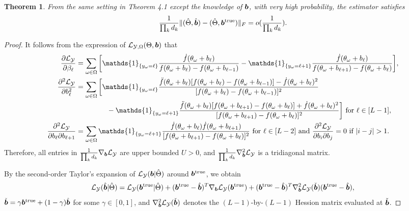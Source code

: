 \documentclass[11pt]{article}
\theoremstyle{plain}
\newtheorem{thm}{Theorem}[section]
\theoremstyle{definition}
\begin{document}
\begin{thm}
  From the same setting in Theorem 4.1 except the knowledge of $\bm{b}$, with very high probability, the estimator satisfies
  \begin{equation}
    \frac{1}{\prod_k d_k}\lVert(\hat\Theta,\hat{\bm{b}})-(\hat\Theta,\bm{b}^{\text{true}})\rVert_F = o(\frac{1}{\prod_k d_k}).
  \end{equation}
\end{thm}

\begin{proof}
It follows from the expression of $\mathcal{L}_{\mathcal{Y},\Omega}(\Theta,\bm{b})$ that
\begin{align}\label{eq:property}
{\partial \flogl\over \partial \beta_\ell}&=\sum_{\omega\in\Omega}\bigg[\mathds{1}_{\{y_{\omega}=\ell\}}
\frac{\dot{f}(\theta_\omega+b_\ell)}{f(\theta_\omega+b_\ell)-f(
\theta_\omega+b_{\ell-1})}-\mathds{1}_{\{y_{\omega}=\ell+1\}}
\frac{\dot{f}(\theta_\omega+b_\ell)}{f(\theta_\omega+b_{\ell+1})-f(\theta_\omega+b_{\ell})}\bigg],\notag\\
{\partial^2 \flogl\over \partial b_\ell^2}&=\sum_{\omega\in\Omega}\bigg[\mathds{1}_{\{y_\omega=\ell\}}\frac{\ddot{f}(\theta_\omega+b_\ell)[f(\theta_\omega+b_\ell)-f(\theta_\omega+b_{\ell-1})]-\dot{f}(\theta_\omega+b_\ell)^2}{[f(\theta_\omega+b_\ell)-f(\theta_\omega+b_{\ell-1})]^2}\\
&\hspace{.6in}-\mathds{1}_{\{y_\omega=\ell+1\}}\frac{\ddot{f}(\theta_\omega+b_\ell)[f(\theta_\omega+b_{\ell+1})-f(\theta_\omega+b_{\ell})]+\dot{f}(\theta_\omega+b_\ell)^2}{[f(\theta_\omega+b_{\ell+1})-f(\theta_\omega+b_{\ell})]^2}\bigg] \text{ for } \ell \in [L-1],\\
{\partial^2 \flogl\over \partial b_\ell \partial b_{\ell+1}}&=\sum_{\omega\in\Omega}\mathds{1}_{\{y_\omega=\ell+1\}}\frac{\dot{f}(\theta_\omega+b_\ell)\dot{f}(\theta_\omega+b_{\ell+1})}{[f(\theta_\omega+b_{\ell+1})-f(\theta_\omega+b_\ell)]^2} \text{ for } \ell \in [L-2] \text{ and } {\partial^2 \flogl\over \partial b_i \partial b_j} = 0 \text{ if } |i-j|>1.
\end{align}
Therefore, all entries in $\frac{1}{\prod_k d_k}\nabla_{\bm{b}}\mathcal{L}_{\mathcal{Y}}$ are upper bounded $U>0$, and  $\frac{1}{\prod_k d_k}\nabla^2_{\bm{b}}\mathcal{L}_{\mathcal{Y}}$ is a tridiagonal matrix.




By the second-order Taylor's expansion of $\mathcal{L}_{\mathcal{Y}}(\bm{b}|\hat\Theta)$ around $\bm{b}^{\text{true}}$, we obtain
\begin{equation}\label{eq:taylor}
\mathcal{L}_{\mathcal{Y}}(\hat{\bm{b}}|\hat\Theta)=\mathcal{L}_{\mathcal{Y}}(\bm{b}^{\text{true}}|\hat\Theta)+(\bm{b}^{\text{true}}-\hat{\bm{b}})^T\nabla_{\bm{b}}\mathcal{L}_{\mathcal{Y}}(\bm{b}^{\text{true}})+ (\bm{b}^{\text{true}}-\hat{\bm{b}})^T\nabla^2_{\bm{b}}\mathcal{L}_{\mathcal{Y}}(\check{\bm{b}})(\bm{b}^{\text{true}}-\hat{\bm{b}}),
\end{equation}
$\check{\bm{b}}=\gamma\bm{b}^{\text{true}}+(1-\gamma)\hat{\bm{b}}$ for some $\gamma\in[0,1]$, and $\nabla^2_{\bm{b}}\mathcal{L}_{\mathcal{Y}}(\check{\bm{b}})$ denotes the $(L-1)$-by-$(L-1)$ Hession matrix evaluated at $\check{\bm{b}}$.


\end{proof}
\end{document}
